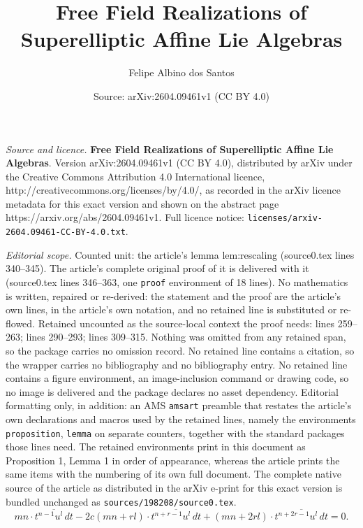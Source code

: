 \documentclass[10pt,a4paper]{amsart}
\title{\textbf{Free Field Realizations of Superelliptic Affine Lie Algebras}}
\author{Felipe Albino dos Santos}
\date{Source: arXiv:2604.09461v1 (CC BY 4.0)}
\begin{document}
\maketitle

\noindent\emph{Source and licence.} \textbf{Free Field Realizations of Superelliptic Affine Lie Algebras}. Version arXiv:2604.09461v1 (CC BY 4.0), distributed by arXiv under the Creative Commons Attribution 4.0 International licence, http://creativecommons.org/licenses/by/4.0/, as recorded in the arXiv licence metadata for this exact version and shown on the abstract page https://arxiv.org/abs/2604.09461v1. Full licence notice: \texttt{licenses/arxiv-2604.09461-CC-BY-4.0.txt}.\par\smallskip

\noindent\textit{Editorial scope.} Counted unit: the article's lemma lem:rescaling (source0.tex lines 340--345). The article's complete original proof of it is delivered with it (source0.tex lines 346--363, one \texttt{proof} environment of 18 lines). No mathematics is written, repaired or re-derived: the statement and the proof are the article's own lines, in the article's own notation, and no retained line is substituted or re-flowed.  Retained uncounted as the source-local context the proof needs: lines 259--263; lines 290--293; lines 309--315.  Nothing was omitted from any retained span, so the package carries no omission record.  No retained line contains a citation, so the wrapper carries no bibliography and no bibliography entry.  No retained line contains a figure environment, an image-inclusion command or drawing code, so no image is delivered and the package declares no asset dependency.  Editorial formatting only, in addition: an AMS \texttt{amsart} preamble that restates the article's own declarations and macros used by the retained lines, namely the environments \texttt{proposition}, \texttt{lemma} on separate counters, together with the standard packages those lines need.  The retained environments print in this document as Proposition 1, Lemma 1 in order of appearance, whereas the article prints the same items with the numbering of its own full document.  The complete native source of the article as distributed in the arXiv e-print for this exact version is bundled unchanged as \texttt{sources/198208/source0.tex}.
  \begin{equation}\label{eq:Kahler-rec}
    mn\cdot\overline{t^{n-1}u^l\,dt}
    -2c(mn+rl)\cdot\overline{t^{n+r-1}u^l\,dt}
    +(mn+2rl)\cdot\overline{t^{n+2r-1}u^l\,dt} = 0.
  \end{equation}
\end{document}
